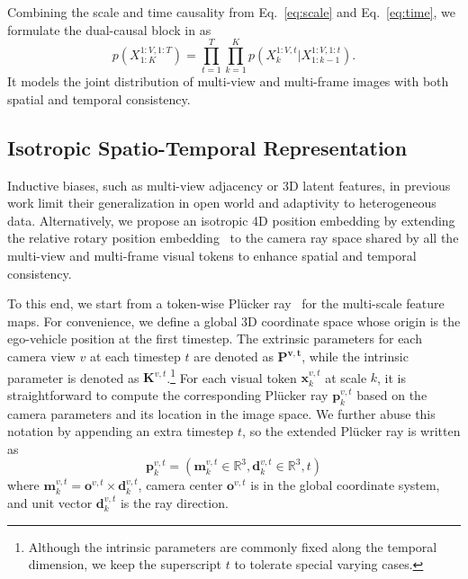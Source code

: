 Combining the scale and time causality from Eq.~\ref{eq:scale} and Eq.~\ref{eq:time}, we formulate the dual-causal block in \ourmethod{} as
\begin{equation}
p\left(X_{1:K}^{1:V,1:T}\right)=\prod_{t=1}^T\prod_{k=1}^Kp\left(X_{k}^{1:V,t}|X_{1:k-1}^{1:V,1:t}\right).
    \label{eq:formulation}
\end{equation}
It models the joint distribution of multi-view and multi-frame images with both spatial and temporal consistency.


\subsection{Isotropic Spatio-Temporal Representation}
\label{sec:space}

Inductive biases, such as multi-view adjacency or 3D latent features, in previous work limit their generalization in open world and adaptivity to heterogeneous data. Alternatively, we propose an isotropic 4D position embedding by extending the relative rotary position embedding~\cite{su2024roformer} to the camera ray space shared by all the multi-view and multi-frame visual tokens to enhance spatial and temporal consistency.

To this end, we start from a token-wise Pl\"ucker ray~\cite{plucker1865xvii} for the multi-scale feature maps. For convenience, we define a global 3D coordinate space whose origin is the ego-vehicle position at the first timestep. The extrinsic parameters for each camera view $v$ at each timestep $t$ are denoted as $\mathbf{P^{v,t}}$, while the intrinsic parameter is denoted as $\mathbf{K}^{v,t}$.\footnote{Although the intrinsic parameters are commonly fixed along the temporal dimension, we keep the superscript $t$ to tolerate special varying cases.} For each visual token $\mathbf{x}^{v,t}_k$ at scale $k$, it is straightforward to compute the corresponding Pl\"ucker ray $\mathbf{p}^{v,t}_k$ based on the camera parameters and its location in the image space. We further abuse this notation by appending an extra timestep $t$, so the extended Pl\"ucker ray is written as 
\begin{equation}
    \mathbf{p}^{v,t}_k=(\mathbf{m}_k^{v,t}\in\mathbb{R}^3,\mathbf{d}_k^{v,t}\in\mathbb{R}^3,t)
    \label{eq:ray}
\end{equation}
where $\mathbf{m}_k^{v,t}=\mathbf{o}^{v,t}\times\mathbf{d}_k^{v,t}$, camera center $\mathbf{o}^{v,t}$ is in the global coordinate system, and unit vector $\mathbf{d}_k^{v,t}$ is the ray direction.

